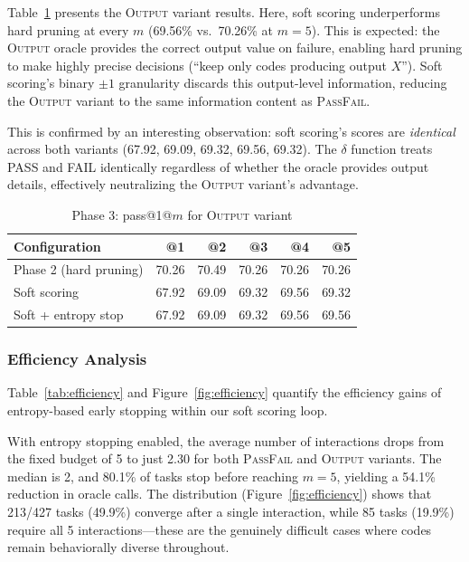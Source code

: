 \documentclass[conference]{IEEEtran}
\begin{document}
Table~\ref{tab:phase3_output} presents the \textsc{Output} variant results. Here, soft scoring underperforms hard pruning at every $m$ (69.56\% vs.\ 70.26\% at $m=5$). This is expected: the \textsc{Output} oracle provides the correct output value on failure, enabling hard pruning to make highly precise decisions (``keep only codes producing output $X$''). Soft scoring's binary $\pm 1$ granularity discards this output-level information, reducing the \textsc{Output} variant to the same information content as \textsc{PassFail}.

This is confirmed by an interesting observation: soft scoring's scores are \emph{identical} across both variants (67.92, 69.09, 69.32, 69.56, 69.32). The $\delta$ function treats PASS and FAIL identically regardless of whether the oracle provides output details, effectively neutralizing the \textsc{Output} variant's advantage.

\begin{table}[t]
\centering
\caption{Phase 3: pass@1@$m$ for \textsc{Output} variant}
\label{tab:phase3_output}
\begin{tabular}{lrrrrr}
\toprule
\textbf{Configuration} & \textbf{@1} & \textbf{@2} & \textbf{@3} & \textbf{@4} & \textbf{@5} \\
\midrule
Phase 2 (hard pruning) & 70.26 & 70.49 & 70.26 & 70.26 & 70.26 \\
Soft scoring & 67.92 & 69.09 & 69.32 & 69.56 & 69.32 \\
Soft + entropy stop & 67.92 & 69.09 & 69.32 & 69.56 & 69.56 \\
\bottomrule
\end{tabular}
\end{table}

\subsubsection{Efficiency Analysis}

Table~\ref{tab:efficiency} and Figure~\ref{fig:efficiency} quantify the efficiency gains of entropy-based early stopping within our soft scoring loop.

With entropy stopping enabled, the average number of interactions drops from the fixed budget of 5 to just 2.30 for both \textsc{PassFail} and \textsc{Output} variants. The median is 2, and 80.1\% of tasks stop before reaching $m=5$, yielding a 54.1\% reduction in oracle calls. The distribution (Figure~\ref{fig:efficiency}) shows that 213/427 tasks (49.9\%) converge after a single interaction, while 85 tasks (19.9\%) require all 5 interactions---these are the genuinely difficult cases where codes remain behaviorally diverse throughout.
\end{document}
